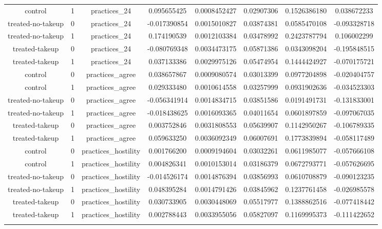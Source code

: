 \begin{table}[!htbp]
\begin{tabular}{@{\extracolsep{5pt}} cccccccc}
control & 1 & practices\_24 &  0.095655425 & 0.0008452427 & 0.02907306 &  0.1526386180 &  0.038672233 \\ 
treated-no-takeup & 0 & practices\_24 & -0.017390854 & 0.0015010827 & 0.03874381 &  0.0585470108 & -0.093328718 \\ 
treated-no-takeup & 1 & practices\_24 &  0.174190539 & 0.0012103384 & 0.03478992 &  0.2423787794 &  0.106002299 \\ 
treated-takeup & 0 & practices\_24 & -0.080769348 & 0.0034473175 & 0.05871386 &  0.0343098204 & -0.195848515 \\ 
treated-takeup & 1 & practices\_24 &  0.037133386 & 0.0029975126 & 0.05474954 &  0.1444424927 & -0.070175721 \\ 
control & 0 & practices\_agree &  0.038657867 & 0.0009080574 & 0.03013399 &  0.0977204898 & -0.020404757 \\ 
control & 1 & practices\_agree &  0.029333480 & 0.0010614558 & 0.03257999 &  0.0931902636 & -0.034523303 \\ 
treated-no-takeup & 0 & practices\_agree & -0.056341914 & 0.0014834715 & 0.03851586 &  0.0191491731 & -0.131833001 \\ 
treated-no-takeup & 1 & practices\_agree & -0.018438625 & 0.0016093365 & 0.04011654 &  0.0601897859 & -0.097067035 \\ 
treated-takeup & 0 & practices\_agree &  0.003752846 & 0.0031808553 & 0.05639907 &  0.1142950267 & -0.106789335 \\ 
treated-takeup & 1 & practices\_agree &  0.059633250 & 0.0036092349 & 0.06007691 &  0.1773839894 & -0.058117489 \\ 
control & 0 & practices\_hostility &  0.001766200 & 0.0009194604 & 0.03032261 &  0.0611985077 & -0.057666108 \\ 
control & 1 & practices\_hostility &  0.004826341 & 0.0010153014 & 0.03186379 &  0.0672793771 & -0.057626695 \\ 
treated-no-takeup & 0 & practices\_hostility & -0.014526174 & 0.0014876394 & 0.03856993 &  0.0610708879 & -0.090123235 \\ 
treated-no-takeup & 1 & practices\_hostility &  0.048395284 & 0.0014791426 & 0.03845962 &  0.1237761458 & -0.026985578 \\ 
treated-takeup & 0 & practices\_hostility &  0.030733905 & 0.0030448069 & 0.05517977 &  0.1388862516 & -0.077418442 \\ 
treated-takeup & 1 & practices\_hostility &  0.002788443 & 0.0033955056 & 0.05827097 &  0.1169995373 & -0.111422652 \\ 
\hline \\[-1.8ex] 
\end{tabular} 
\end{table} 
